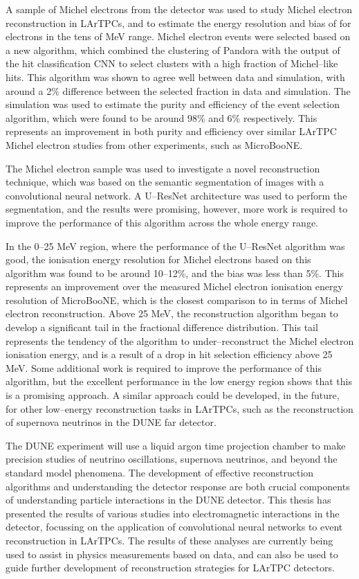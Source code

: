 A sample of Michel electrons from the \protodune{} detector was used to study
Michel electron reconstruction in LArTPCs, and to estimate the energy resolution
and bias of \protodune{} for electrons in the tens of MeV range. Michel electron
events were selected based on a new algorithm, which combined the clustering of
Pandora with the output of the hit classification CNN to select clusters with a
high fraction of Michel--like hits. This algorithm was shown to agree well
between data and simulation, with around a 2\% difference between the selected
fraction in data and simulation. The simulation was used to estimate the purity
and efficiency of the event selection algorithm, which were found to be around
98\% and 6\% respectively. This represents an improvement in both purity and
efficiency over similar LArTPC Michel electron studies from other experiments,
such as MicroBooNE.

The Michel electron sample was used to investigate a novel reconstruction
technique, which was based on the semantic segmentation of images with a
convolutional neural network. A U--ResNet architecture was used to perform the
segmentation, and the results were promising, however, more work is required to
improve the performance of this algorithm across the whole energy range. 

In the 0--25 MeV region, where the performance of the U--ResNet algorithm was 
good, the ionisation energy resolution for Michel electrons based on this 
algorithm was found to be around 10--12\%, and the bias was less than 
5\%. This represents an improvement over the measured Michel electron ionisation
energy resolution of MicroBooNE, which is the closest comparison to \protodune{}
in terms of Michel electron reconstruction. Above 25 MeV, the reconstruction 
algorithm began to develop a significant tail in the fractional difference 
distribution. This tail represents the tendency of the algorithm to 
under--reconstruct the Michel electron ionisation energy, and is a result of a 
drop in hit selection efficiency above 25 MeV. Some additional work
is required to improve the performance of this algorithm, but the excellent
performance in the low energy region shows that this is a promising approach. A
similar approach could be developed, in the future, for other low--energy 
reconstruction tasks in LArTPCs, such as the reconstruction of supernova 
neutrinos in the DUNE far detector.

The DUNE experiment will use a liquid argon time projection chamber to make 
precision studies of neutrino oscillations, supernova neutrinos, and beyond 
the standard model phenomena. The development of effective reconstruction 
algorithms and understanding the detector response are both crucial components 
of understanding particle interactions in the DUNE detector. This thesis has 
presented the results of various studies into electromagnetic interactions in 
the \protodune{} detector, focussing on the application of convolutional 
neural networks to event reconstruction in LArTPCs. The results of these 
analyses are currently being used to assist in physics measurements based on 
\protodune{} data, and can also be used to guide further development of 
reconstruction strategies for LArTPC detectors.
